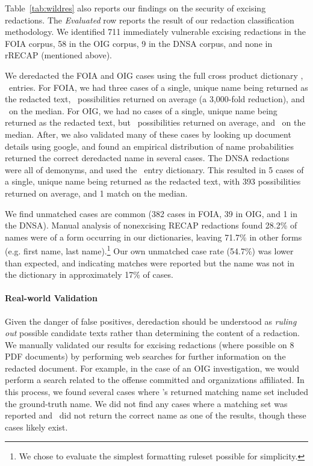 Table~\ref{tab:wildres} also reports our findings on the security of excising redactions.
The \emph{Evaluated} row reports the result of our redaction classification methodology.
We identified 711 immediately vulnerable excising redactions in the FOIA corpus, 58 in the OIG corpus, 9 in the DNSA corpus, and none in rRECAP (mentioned above).

We deredacted the FOIA and OIG cases using the full cross product dictionary \emph{\fnxlnname}, \neltfnln\ entries.
For FOIA, we had three cases of a single, unique name being returned as the redacted text, \numFOIAavg\ possibilities returned on average (a 3,000-fold reduction), and \numFOIAmed\ on the median.
For OIG, we had no cases of a single, unique name being returned as the redacted text, but \numOIGavg\ possibilities returned on average, and \numOIGmed\ on the median.
After, we also validated many of these cases by looking up document details using google, and found an empirical distribution of name probabilities returned the correct deredacted name in several cases.
The DNSA redactions were all of demonyms, and used the \neltnatl\ entry dictionary.
This resulted in 5 cases of a single, unique name being returned as the redacted text, with 393 possibilities returned on average, and 1 match on the median.

We find unmatched cases are common (382 cases in FOIA, 39 in OIG, and 1 in the DNSA).
Manual analysis of nonexcising RECAP redactions found 28.2\% of names were of a form occurring in our dictionaries, leaving 71.7\% in other forms (e.g. first name, last name).\footnote{We chose to evaluate the simplest formatting ruleset possible for simplicity.}
Our own unmatched case rate (54.7\%) was lower than expected, and indicating matches were reported but the name was not in the dictionary in approximately 17\% of cases.

\paragraph{Real-world Validation}
Given the danger of false positives, deredaction should be understood as \emph{ruling out} possible candidate texts rather than determining the content of a redaction.
We manually validated our results for excising redactions (where possible on 8 PDF documents) by performing web searches for further information on the redacted document.
For example, in the case of an OIG investigation, we would perform a search related to the offense committed and organizations affiliated.
In this process, we found several cases where \maxray's returned matching name set included the ground-truth name.
We did not find any cases where a matching set was reported and \maxray\ did not return the correct name as one of the results, though these cases likely exist.

